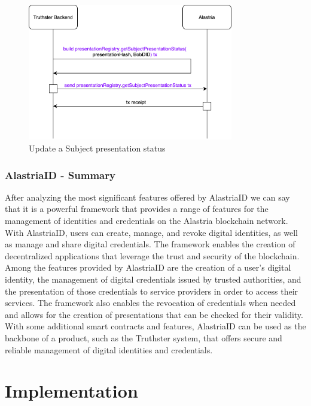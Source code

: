 \documentclass[target=mst,aauheader=]{thud}
\begin{document}
\begin{figure}
    \centering
    \includegraphics[width=0.8\textwidth]{images/checkSubjectPresentationStatus.png}
    \caption{Update a Subject presentation status}
    \label{fig:checkSubjectPresentationStatus}
\end{figure}

\subsection{AlastriaID - Summary}

After analyzing the most significant features offered by AlastriaID we can say that it is a powerful framework that provides a range of features for the management of identities and credentials on the Alastria blockchain network. With AlastriaID, users can create, manage, and revoke digital identities, as well as manage and share digital credentials. The framework enables the creation of decentralized applications that leverage the trust and security of the blockchain. Among the features provided by AlastriaID are the creation of a user's digital identity, the management of digital credentials issued by trusted authorities, and the presentation of those credentials to service providers in order to access their services. The framework also enables the revocation of credentials when needed and allows for the creation of presentations that can be checked for their validity. With some additional smart contracts and features, AlastriaID can be used as the backbone of a product, such as the Truthster system, that offers secure and reliable management of digital identities and credentials.




\chapter{Implementation}
\end{document}
